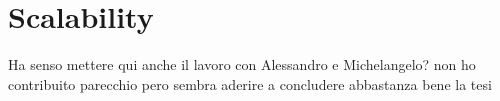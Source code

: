 
\chapter{Scalability}
\label{chap:10_scalability}
	\graphicspath{{Chapter10/}}
Ha senso mettere qui anche il lavoro con Alessandro e Michelangelo? non ho contribuito parecchio pero sembra aderire a concludere abbastanza bene la tesi


